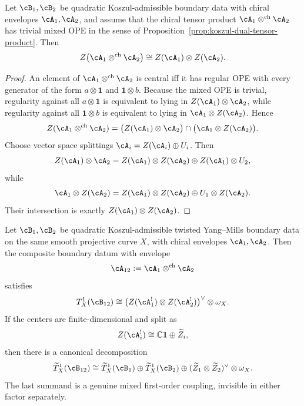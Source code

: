 \begin{lemma}
\label{lem:twisted-ym-center-tensor}
Let $\cB_1,\cB_2$ be quadratic Koszul-admissible boundary data with chiral envelopes $\cA_1,\cA_2$, and assume that the chiral tensor product $\cA_1\otimes^{\mathrm{ch}}\cA_2$ has trivial mixed OPE \/in the sense of Proposition~\ref{prop:koszul-dual-tensor-product}.  Then
\[
Z\bigl(\cA_1\otimes^{\mathrm{ch}}\cA_2\bigr)
\cong
Z(\cA_1)\otimes Z(\cA_2).
\]
\end{lemma}

\begin{proof}
An element of $\cA_1\otimes^{\mathrm{ch}}\cA_2$ is central iff it has regular OPE with every generator of the form $a\otimes \mathbf{1}$ and $\mathbf{1}\otimes b$.  Because the mixed OPE is trivial, regularity against all $a\otimes \mathbf{1}$ is equivalent to lying in $Z(\cA_1)\otimes \cA_2$, while regularity against all $\mathbf{1}\otimes b$ is equivalent to lying in $\cA_1\otimes Z(\cA_2)$.  Hence
\[
Z(\cA_1\otimes^{\mathrm{ch}}\cA_2)
=
\bigl(Z(\cA_1)\otimes \cA_2\bigr)
\cap
\bigl(\cA_1\otimes Z(\cA_2)\bigr).
\]
Choose vector space splittings $\cA_i = Z(\cA_i)\oplus U_i$.  Then
\[
Z(\cA_1)\otimes \cA_2
=
Z(\cA_1)\otimes Z(\cA_2)
\oplus
Z(\cA_1)\otimes U_2,
\]
while
\[
\cA_1\otimes Z(\cA_2)
=
Z(\cA_1)\otimes Z(\cA_2)
\oplus
U_1\otimes Z(\cA_2).
\]
Their intersection is exactly $Z(\cA_1)\otimes Z(\cA_2)$.
\end{proof}

\begin{theorem}
\label{thm:twisted-ym-binary-mixed-couplings}
Let $\cB_1,\cB_2$ be quadratic Koszul-admissible twisted Yang--Mills boundary data on the same smooth projective curve $X$, with chiral envelopes $\cA_1,\cA_2$.  Then the composite boundary datum with envelope
\[
\cA_{12}:=\cA_1\otimes^{\mathrm{ch}}\cA_2
\]
satisfies
\[
T^1_X(\cB_{12})
\cong
\bigl(Z(\cA_1^{!})\otimes Z(\cA_2^{!})\bigr)^{\vee}\otimes \omega_X.
\]
If the centers are finite-dimensional and split as
\[
Z(\cA_i^{!}) \cong \mathbb{C}\mathbf{1}\oplus \widetilde Z_i,
\]
then there is a canonical decomposition
\[
\widetilde T^1_X(\cB_{12})
\cong
\widetilde T^1_X(\cB_1)
\oplus
\widetilde T^1_X(\cB_2)
\oplus
(\widetilde Z_1\otimes \widetilde Z_2)^{\vee}\otimes \omega_X.
\]
The last summand is a genuine mixed first-order coupling, invisible in either factor separately.
\end{theorem}

